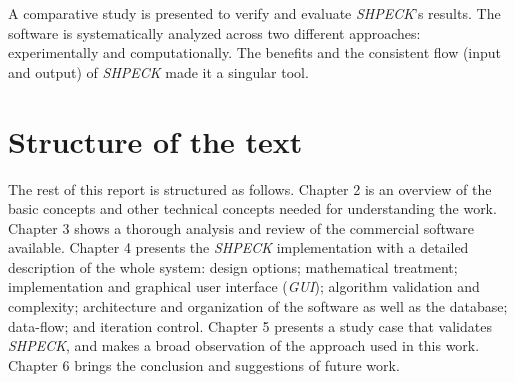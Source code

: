 
A comparative study is presented to verify and evaluate \emph{SHPECK}'s results. The software is systematically analyzed across two different approaches: experimentally and computationally. The benefits and the consistent flow (input and output) of \emph{SHPECK} made it a singular tool. 

\section{Structure of the text}
The rest of this report is structured as follows. Chapter 2 is an overview of the basic concepts and other technical concepts needed for understanding the work. Chapter 3 shows a thorough analysis and review of the commercial software available. Chapter 4 presents the \emph{SHPECK} implementation with a detailed description of the whole system: design options; mathematical treatment; implementation and graphical user interface (\emph{GUI}); algorithm validation and complexity; architecture and organization of the software as well as the database; data-flow; and iteration control. Chapter 5 presents a study case that validates \emph{SHPECK}, and makes a broad observation of the approach used in this work. Chapter 6 brings the conclusion and suggestions of future work.